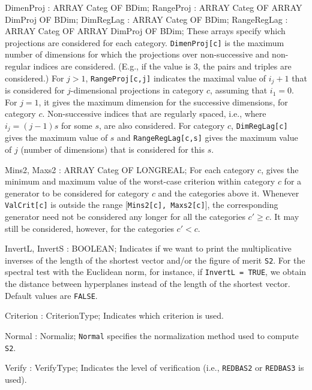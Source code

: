       DimenProj     : ARRAY Categ OF BDim;
      RangeProj     : ARRAY Categ OF ARRAY DimProj OF BDim;
      DimRegLag     : ARRAY Categ OF BDim;
      RangeRegLag   : ARRAY Categ OF ARRAY DimProj OF BDim;
\endcode
\tabbb
   These arrays specify which projections are considered for each category.
   {\tt DimenProj[c]} is the maximum number of dimensions for which the
   projections over non-successive and non-regular indices are considered.
   (E.g., if the value is 3, the pairs and triples are considered.)
   For $j>1$, {\tt RangeProj[c,j]} indicates the maximal value of $i_j+1$
   that is considered for $j$-dimensional projections in category $c$,
   assuming that $i_1=0$.  For $j=1$, it gives the maximum dimension for
   the successive dimensions, for category $c$.
   Non-successive indices that are regularly spaced, i.e., where
   $i_j = (j-1)s$ for some $s$, are also considered.
   For category $c$, {\tt DimRegLag[c]} gives the maximum value of $s$
   and {\tt RangeRegLag[c,s]} gives the maximum value of $j$ (number
   of dimensions) that is considered for this $s$.
\endtabbb
\code

      Mins2, Maxs2  : ARRAY Categ OF LONGREAL;
\endcode
\tabbb
   For each category $c$, gives the minimum and maximum value of the 
   worst-case criterion within category $c$ for a generator to be 
   considered for category $c$ and the categories above it.
   Whenever {\tt ValCrit[c]} is outside the range
   [{\tt Mins2[c], Maxs2[c]}], the corresponding generator need not be
   considered any longer for all the categories $c'\ge c$.
   It may still be considered, however, for the categories $c'<c$.
\endtabbb
\code

      InvertL, InvertS : BOOLEAN;
\endcode
\tabbb
   Indicates if we want to print the multiplicative inverses of
   the length of the shortest vector and/or the figure of merit {\tt S2}.
   For the spectral test with the Euclidean norm, for instance, 
   if {\tt InvertL = TRUE}, we obtain the distance between hyperplanes
   instead of the length of the shortest vector.
   Default values are {\tt FALSE}.
\endtabbb
\code

      Criterion     : CriterionType;
\endcode
\tabbb
   Indicates which criterion is used. 
\endtabbb
\code

      Normal        : Normaliz;
\endcode
\tabbb
   {\tt Normal} specifies the normalization method
   used to compute {\tt S2}.
\endtabbb
\code

      Verify        : VerifyType;
\endcode
\tabbb
   Indicates the level of verification (i.e., {\tt REDBAS2} or
   {\tt REDBAS3} is used).
\endtabbb
\code

